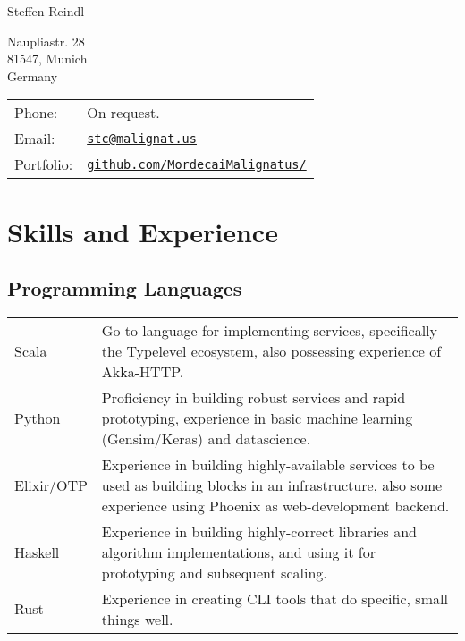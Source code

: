 \documentclass[a4paper]{article}
\def\name{Steffen Reindl}
\begin{document}
{\huge \name}
\vspace{0.25in}

\begin{minipage}{0.45\linewidth}
  Naupliastr. 28\\
  81547, Munich\\
  Germany
\end{minipage}
\begin{minipage}{0.45\linewidth}
  \begin{tabular}{ll}
    Phone: & On request. \\
    Email: & \href{mailto:stc@malignat.us}{\tt stc@malignat.us} \\
    Portfolio: & \href{https://github.com/MordecaiMalignatus/}{\tt github.com/MordecaiMalignatus/}
  \end{tabular}
\end{minipage}

\section*{Skills and Experience}

\subsection*{Programming Languages}
\begin{tabular}{ l p{14cm} }
Scala & Go-to language for implementing services, specifically the Typelevel ecosystem,
also possessing experience of Akka-HTTP.\\
Python & Proficiency in building robust services and rapid prototyping,
experience in basic machine learning (Gensim/Keras) and datascience.\\
Elixir/OTP & Experience in building highly-available services to be used as
building blocks in an infrastructure, also some experience using Phoenix as
web-development backend.\\
Haskell & Experience in building highly-correct libraries and algorithm
implementations, and using it for prototyping and subsequent scaling.\\
Rust & Experience in creating CLI tools that do specific, small things well. \\
\end{tabular}
\end{document}
